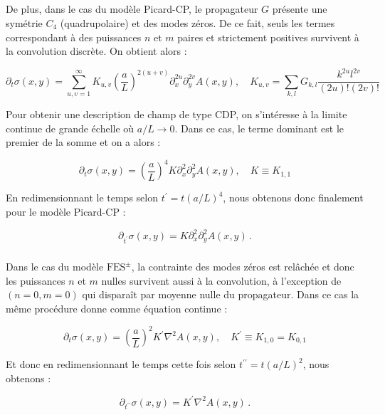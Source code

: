 \subparagraph{}De plus, dans le cas du modèle Picard-CP, le propagateur $G$ présente une symétrie $C_4$ (quadrupolaire) et des modes zéros. De ce fait, seuls les termes correspondant à des puissances $n$ et $m$ paires et strictement positives survivent à la convolution discrète. On obtient alors :

\begin{equation}
    \partial_t\sigma (x,y) = \sum_{u,v=1}^{\infty}K_{u,v}\left( \frac{a}{L} \right)^{2(u+v)}\partial_x^{2u}\partial_y^{2v}A(x, y), \quad K_{u,v} = \sum_{k,l}G_{k,l}\frac{k^{2u}l^{2v}}{(2u)!(2v)!}
\label{eq:3}
\end{equation}

\noindent Pour obtenir une description de champ de type CDP, on s'intéresse à la limite continue de grande échelle où $a/L\rightarrow 0$. Dans ce cas, le terme dominant est le premier de la somme et on a alors :

\begin{equation}
    \partial_t\sigma (x,y) = \left( \frac{a}{L} \right)^{4}K\partial_x^{2}\partial_y^{2}A(x, y), \quad K \equiv K_{1,1}
    \label{eq:evol:sigma:CDP0:raw}
\end{equation}

\noindent En redimensionnant le temps selon $t^\prime=t(a/L)^4$, nous obtenons donc finalement pour le modèle Picard-CP :

\begin{equation}
    \partial_{t^\prime}\sigma (x,y) = K\partial_x^{2}\partial_y^{2}A(x, y)\, .
    \label{eq:evol:sigma:CDP0}
\end{equation}

\subparagraph{}Dans le cas du modèle $\text{FES}^\pm$, la contrainte des modes zéros est relâchée et donc les puissances $n$ et $m$ nulles survivent aussi à la convolution, à l'exception de $(n=0,m=0)$ qui disparaît par moyenne nulle du propagateur. Dans ce cas la même procédure donne comme équation continue : 

\begin{equation}
    \partial_t\sigma (x,y) = \left( \frac{a}{L} \right)^{2}K^\prime\nabla^2 A(x, y), \quad K^\prime \equiv K_{1,0} = K_{0,1}
    \label{eq:evol:sigma:CDP:raw}
\end{equation}

\noindent Et donc en redimensionnant le temps cette fois selon $t^{\prime\prime}=t(a/L)^2$, nous obtenons :

\begin{equation}
    \partial_{t^{\prime\prime}}\sigma (x,y) = K^\prime\nabla^2 A(x, y)\, .
    \label{eq:evol:sigma:CDP}
\end{equation}

